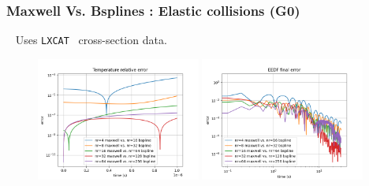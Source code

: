 \documentclass[mathserif, aspectratio=169]{beamer}
\newcommand{\lxcat}{\texttt{LXCAT}}
\begin{document}
	\begin{frame}
		\frametitle{Maxwell Vs. Bsplines : Elastic collisions (G0)}
		\textbullet~ Uses \lxcat~ cross-section data. 
		\begin{figure}
		\includegraphics[width=0.48\textwidth]{g0_mw_bs_temp_error.png}
		\includegraphics[width=0.48\textwidth]{g0_mw_bs_eedf_final_error.png}
		\end{figure}
	\end{frame}
\end{document}
